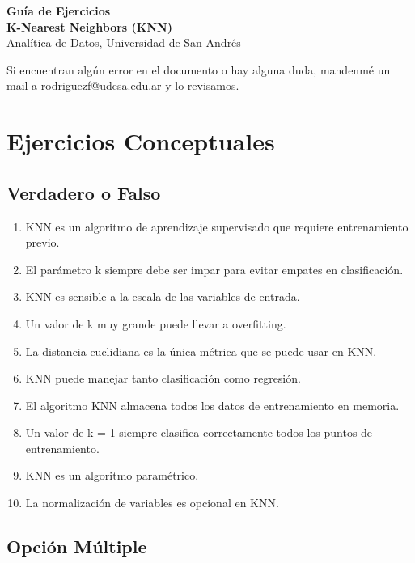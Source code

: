 \documentclass[12pt]{article}
\begin{document}
\begin{center}
  {\LARGE \textbf{Guía de Ejercicios\\K-Nearest Neighbors (KNN)}}\\[0.5em]
  {Analítica de Datos, Universidad de San Andrés}
\end{center}

Si encuentran algún error en el documento o hay alguna duda, mandenmé un mail a rodriguezf@udesa.edu.ar y lo revisamos.

\section{Ejercicios Conceptuales}

\subsection{Verdadero o Falso}

\begin{enumerate}
    \item KNN es un algoritmo de aprendizaje supervisado que requiere entrenamiento previo.
    \item El parámetro k siempre debe ser impar para evitar empates en clasificación.
    \item KNN es sensible a la escala de las variables de entrada.
    \item Un valor de k muy grande puede llevar a overfitting.
    \item La distancia euclidiana es la única métrica que se puede usar en KNN.
    \item KNN puede manejar tanto clasificación como regresión.
    \item El algoritmo KNN almacena todos los datos de entrenamiento en memoria.
    \item Un valor de k = 1 siempre clasifica correctamente todos los puntos de entrenamiento.
    \item KNN es un algoritmo paramétrico.
    \item La normalización de variables es opcional en KNN.
\end{enumerate}

\subsection{Opción Múltiple}
\end{document}

